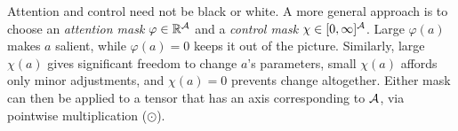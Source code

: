 Attention and control need not be black or white.
A more general approach is to choose
    an \emph{attention mask} $\varphi \in \mathbb R^{\mathcal A}$ and
    a \emph{control mask} $\chi \in [0,\infty]^{\mathcal A}$.
Large $\varphi(a)$ makes $a$ salient, while $\varphi(a) = 0$
    keeps it out of the picture.
Similarly, large $\chi(a)$ gives significant freedom to change $a$'s parameters,
small $\chi(a)$ affords only minor adjustments, and $\chi(a) \!=\! 0$
    prevents change altogether.
Either mask can then be applied to
    a tensor that has an axis corresponding to $\mathcal A$, via
    pointwise multiplication ($\odot$).
%

